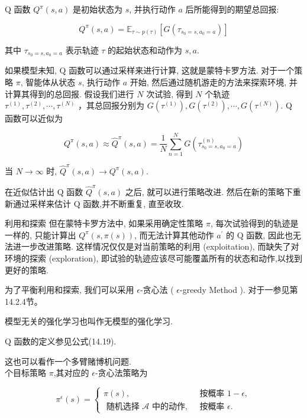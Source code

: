\documentclass[10pt]{article}
\begin{document}
$\mathrm{Q}$ 函数 $Q^{\pi}(s, a)$ 是初始状态为 $s$, 并执行动作 $a$ 后所能得到的期望总回报:


\begin{equation*}
Q^{\pi}(s, a)=\mathbb{E}_{\tau \sim p(\tau)}\left[G\left(\tau_{s_{0}=s, a_{0}=a}\right)\right] \tag{14.29}
\end{equation*}


其中 $\tau_{s_{0}=s, a_{0}=a}$ 表示轨迹 $\tau$ 的起始状态和动作为 $s, a$.

如果模型未知, $\mathrm{Q}$ 函数可以通过采样来进行计算, 这就是蒙特卡罗方法. 对于一个策略 $\pi$, 智能体从状态 $s$, 执行动作 $a$ 开始, 然后通过随机游走的方法来探索环境, 并计算其得到的总回报. 假设我们进行 $N$ 次试验, 得到 $N$ 个轨迹 $\tau^{(1)}, \tau^{(2)}, \cdots, \tau^{(N)}$ ，其总回报分别为 $G\left(\tau^{(1)}\right), G\left(\tau^{(2)}\right), \cdots, G\left(\tau^{(N)}\right)$. Q 函数可以近似为


\begin{equation*}
Q^{\pi}(s, a) \approx \hat{Q}^{\pi}(s, a)=\frac{1}{N} \sum_{n=1}^{N} G\left(\tau_{s_{0}=s, a_{0}=a}^{(n)}\right) \tag{14.30}
\end{equation*}


当 $N \rightarrow \infty$ 时, $\hat{Q}^{\pi}(s, a) \rightarrow Q^{\pi}(s, a)$.

在近似估计出 $\mathrm{Q}$ 函数 $\hat{Q}^{\pi}(s, a)$ 之后, 就可以进行策略改进. 然后在新的策略下重新通过采样来估计 $\mathrm{Q}$ 函数,并不断重复, 直至收玫.

利用和探索 但在蒙特卡罗方法中, 如果采用确定性策略 $\pi$, 每次试验得到的轨迹是一样的, 只能计算出 $Q^{\pi}(s, \pi(s))$, 而无法计算其他动作 $a^{\prime}$ 的 $\mathrm{Q}$ 函数, 因此也无法进一步改进策略. 这样情况仅仅是对当前策略的利用 (exploitation), 而缺失了对环境的探索 (exploration), 即试验的轨迹应该尽可能覆盖所有的状态和动作,以找到更好的策略.

为了平衡利用和探索, 我们可以采用 $\epsilon$-贪心法 ( $\epsilon$-greedy Method ). 对于一参见第14.2.4节。

模型无关的强化学习也叫作无模型的强化学习.

$\mathrm{Q}$ 函数的定义参见公式(14.19).

这也可以看作一个多臂赌博机问题.\\
个目标策略 $\pi$,其对应的 $\epsilon$-贪心法策略为

\[
\pi^{\epsilon}(s)=\left\{\begin{array}{cc}
\pi(s), & \text { 按概率 } 1-\epsilon,  \tag{14.31}\\
\text { 随机选择 } \mathcal{A} \text { 中的动作, } & \text { 按概率 } \epsilon .
\end{array}\right.
\]
\end{document}
